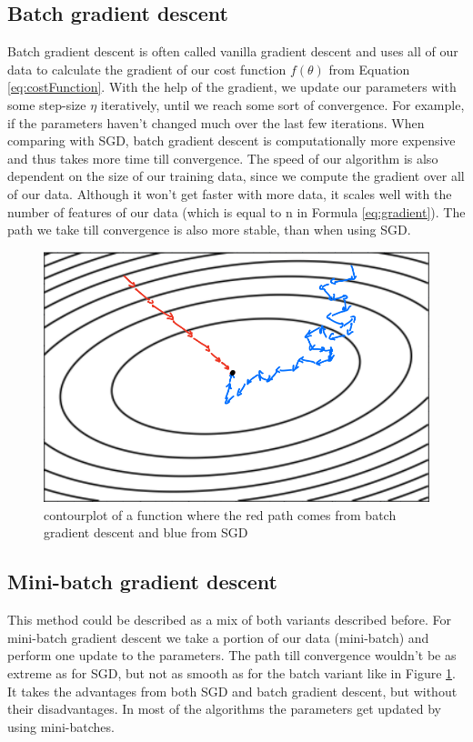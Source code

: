 \documentclass[aodsor,preprint]{imsart}
\numberwithin{equation}{section}
\theoremstyle{plain}
\begin{document}
\subsection{Batch gradient descent}
Batch gradient descent is often called vanilla gradient descent and uses all of our data to calculate the gradient of our cost function $f(\theta)$ from Equation \ref{eq:costFunction}. With the help of the gradient, we update our parameters with some step-size $\eta$ iteratively, until we reach some sort of convergence. For example, if the parameters haven't changed much over the last few iterations. When comparing with SGD, batch gradient descent is computationally more expensive and thus takes more time till convergence. The speed of our algorithm is also dependent on the size of our training data, since we compute the gradient over all of our data. Although it won't get faster with more data, it scales well with the number of features of our data (which is equal to n in Formula \ref{eq:gradient}). The path we take till convergence is also more stable, than when using SGD.

\begin{figure}[htb]
\centering
\includegraphics[scale=0.3]{images/contour.png}
\caption{contourplot of a function where the red path comes from batch gradient descent and blue from SGD}
\label{fig:contour}
\end{figure}

\subsection{Mini-batch gradient descent}
This method could be described as a mix of both variants described before. For mini-batch gradient descent we take a portion of our data (mini-batch) and perform one update to the parameters. The path till convergence wouldn't be as extreme as for SGD, but not as smooth as for the batch variant like in Figure \ref{fig:contour}. It takes the advantages from both SGD and batch gradient descent, but without their disadvantages. In most of the algorithms the parameters get updated by using mini-batches.
\end{document}
